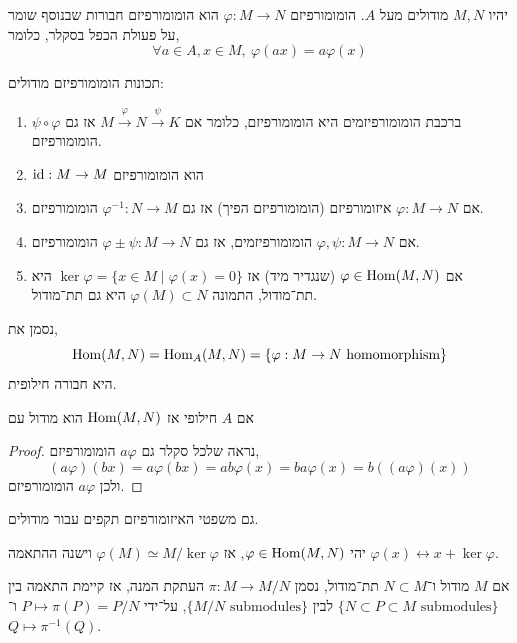 \begin{definition}
	יהיו $M, N$ מודולים מעל $A$.
	הומומורפיזם $\varphi : M \to N$ הוא הומומורפיזם חבורות שבנוסף שומר על פעולת הכפל בסקלר, כלומר,
	\[
		\forall a \in A, x \in M,\ 
		\varphi(a x) = a \varphi(x)
	\]
\end{definition}
\begin{proposition}
	תכונות הומומורפיזם מודולים:
	\begin{enumerate}
		\item ברכבת הומומורפיזמים היא הומומורפיזם, כלומר אם $M \xrightarrow{\varphi} N \xrightarrow{\psi} K$ אז גם $\psi \circ \varphi$ הומומורפיזם.
		\item $\operatorname{id} : M \to M$ הוא הומומורפיזם
		\item אם $\varphi : M \to N$ איזומורפיזם (הומומורפיזם הפיך) אז גם $\varphi^{-1} : N \to M$ הומומורפיזם.
		\item אם $\varphi, \psi : M \to N$ הומומורפיזמים, אז גם $\varphi \pm \psi : M \to N$ הומומורפיזם.
		\item אם $\varphi \in \operatorname{Hom}(M, N)$ (שנגדיר מיד) אז $\ker \varphi = \{ x \in M \mid \varphi(x) = 0 \}$ היא תת־מודול, התמונה $\varphi(M) \subset N$ היא גם תת־מודול.
	\end{enumerate}
\end{proposition}
\begin{definition}
	נסמן את,
	\[
		\operatorname{Hom}(M, N)
		= \operatorname{Hom}_A(M, N)
		= \{ \varphi : M \to N \text{ homomorphism} \}
	\]
	היא חבורה חילופית.
\end{definition}
\begin{proposition}
	אם $A$ חילופי אז $\operatorname{Hom}(M, N)$ הוא מודול עם 
\end{proposition}
\begin{proof}
	נראה שלכל סקלר גם $a \varphi$ הומומורפיזם,
	\[
		(a \varphi)(b x)
		= a \varphi(b x)
		= a b \varphi(x)
		= b a \varphi(x)
		= b ((a \varphi)(x))
	\]
	ולכן $a \varphi$ הומומורפיזם.
\end{proof}
גם משפטי האיזומורפיזם תקפים עבור מודולים.
\begin{theorem}
	יהי $\varphi \in \operatorname{Hom}(M, N)$, אז $\varphi(M) \simeq M / \ker \varphi$ וישנה ההתאמה $\varphi(x) \leftrightarrow x + \ker \varphi$.
\end{theorem}
\begin{theorem}[ההתאמה]
	אם $M$ מודול ו־$N \subset M$ תת־מודול, נסמן $\pi : M \to M / N$ העתקת המנה, אז קיימת התאמה בין $\{ N \subset P \subset M \text{ submodules} \}$ לבין $\{ M / N \text{ submodules} \}$,
	על־ידי $P \mapsto \pi(P) = P / N$ ו־$Q \mapsto \pi^{-1}(Q)$.
\end{theorem}
